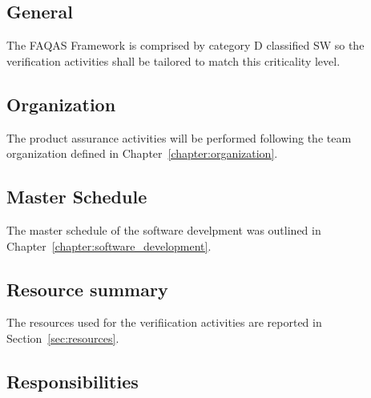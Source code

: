 \subsection{General}

The FAQAS Framework is comprised by category D classified SW so the verification activities shall be tailored to match this criticality level.


\subsection{Organization}

The product assurance activities will be performed following the team organization defined in Chapter~\ref{chapter:organization}.

\subsection{Master Schedule}

The master schedule of the software develpment was outlined in Chapter~\ref{chapter:software_development}.

\subsection{Resource summary}

The resources used for the verifiication activities are reported in Section~\ref{sec:resources}.

\subsection{Responsibilities}


